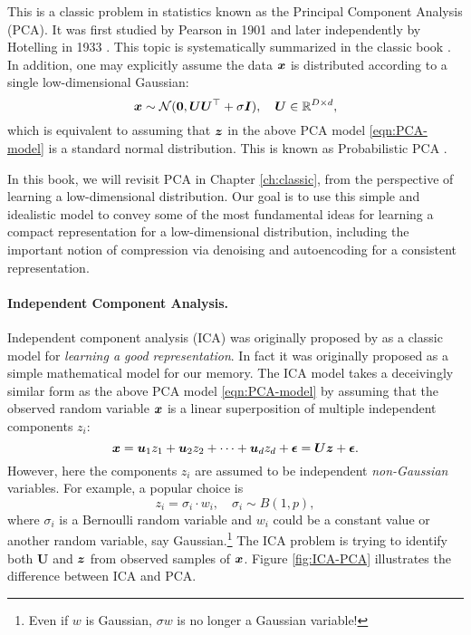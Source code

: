 \documentclass[../../book-main.tex]{subfiles}
\begin{document}
This is a classic problem in statistics known as the Principal Component Analysis (PCA). It was first studied by Pearson in 1901 \cite{Pearson1901} and later independently by Hotelling in 1933 \cite{Hotelling1933}. This topic is systematically summarized in the classic book \cite{Jolliffe1986,JolliffeI2002}.
In addition, one may explicitly assume the data $\bm{x}$ is distributed according to a single low-dimensional Gaussian:
\begin{equation}
    \bm{x} \sim \mathcal{N}(\boldsymbol{0}, \boldsymbol{U}\boldsymbol{U}^\top + \sigma \bm{I}), \quad \boldsymbol{U} \in \mathbb{R}^{D\times d},
\end{equation}
which is equivalent to assuming that  $\bm{z}$ in the above PCA model \eqref{eqn:PCA-model} is a standard normal distribution. 
This is known as Probabilistic PCA \cite{TippingM1999}. 

In this book, we will revisit  PCA in Chapter \ref{ch:classic}, from the perspective of learning a low-dimensional distribution. Our goal is to use this simple and idealistic model to convey some of the most fundamental ideas for learning a compact representation for a low-dimensional distribution, including the important notion of compression via denoising and autoencoding for a consistent representation.

\paragraph{Independent Component Analysis.}
Independent component analysis (ICA) was originally proposed by \cite{Ans-1985} as a classic model for {\em learning a good representation}. In fact it was originally proposed as a simple mathematical model for our memory. The ICA model takes a deceivingly similar form as the above PCA model \eqref{eqn:PCA-model} by assuming that the observed random variable $\bm{x}$ is a linear superposition of multiple independent components $z_i$:
\begin{equation}
    \bm{x} = \boldsymbol{u}_1 z_1 + \boldsymbol{u}_2 z_2 + \cdots + \boldsymbol{u}_d z_d  + \boldsymbol{\epsilon} =  \boldsymbol{U} \bm{z} + \boldsymbol{\epsilon}.
    \label{eqn:ICA-model}
\end{equation}
However, here the components $z_i$ are assumed to be independent {\em non-Gaussian} variables. For example, a popular choice is
\begin{equation}
    z_i = \sigma_i \cdot w_i, \quad \sigma_i \sim B(1,p),
    \label{eqn:ICA-modes}
\end{equation}
where $\sigma_i$ is a Bernoulli random variable and $w_i$ could be a constant value or another random variable, say Gaussian.\footnote{Even if $w$ is Gaussian, $\sigma w$ is no longer a Gaussian variable!}  The ICA problem is trying to identify both $\boldsymbol{U}$ and $\bm{z}$ from observed samples of $\bm{x}$. Figure \ref{fig:ICA-PCA} illustrates the difference between ICA and PCA.
\end{document}
